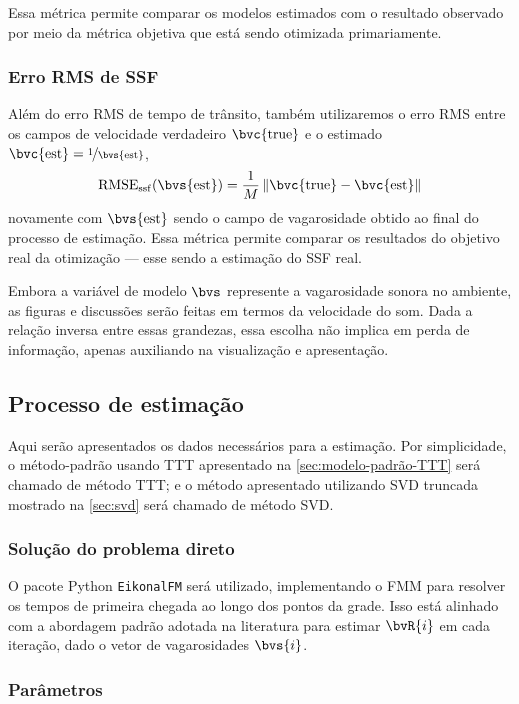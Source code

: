 Essa métrica permite comparar os modelos estimados com o resultado observado por meio da métrica objetiva que está sendo otimizada primariamente.

\subsubsection*{Erro RMS de SSF}
Além do erro RMS de tempo de trânsito, também utilizaremos o erro RMS entre os campos de velocidade verdadeiro $\bvc{\true}$ e o estimado $\bvc{\est} = \nfrac{1}{\bvs{\est}}$,
\begin{equation}
	\rmse_{\ssf}(\bvs{\est}) = \frac{1}{M} \norm{\bvc{\true} - \bvc{\est}}
	\label{eq:sec3:rmse_ssf}
\end{equation}
novamente com $\bvs{\est}$ sendo o campo de vagarosidade obtido ao final do processo de estimação. Essa métrica permite comparar os resultados do objetivo real da otimização --- esse sendo a estimação do SSF real.

Embora a variável de modelo $\bvs$ represente a vagarosidade sonora no ambiente, as figuras e discussões serão feitas em termos da velocidade do som. Dada a relação inversa entre essas grandezas, essa escolha não implica em perda de informação, apenas auxiliando na visualização e apresentação.

\subsection{Processo de estimação}

Aqui serão apresentados os dados necessários para a estimação. Por simplicidade, o método-padrão usando TTT apresentado na \cref{sec:modelo-padrão-TTT} será chamado de método TTT; e o método apresentado utilizando SVD truncada mostrado na \cref{sec:svd} será chamado de método SVD.

\subsubsection*{Solução do problema direto}
O pacote Python \texttt{EikonalFM} \cite{ganster_eikonalfm_2025} será utilizado, implementando o FMM \cite{sethian_fast_1999,chopp_improvements_2001} para resolver os tempos de primeira chegada ao longo dos pontos da grade. Isso está alinhado com a abordagem padrão adotada na literatura para estimar $\bvR{i}$ em cada iteração, dado o vetor de vagarosidades $\bvs{i}$.

\subsubsection*{Parâmetros}

